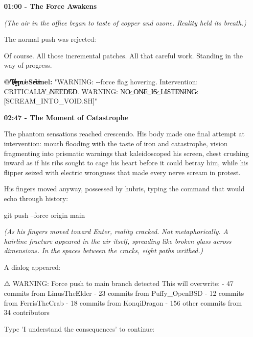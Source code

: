 \textbf{01:00 - The Force Awakens}

\emph{(The air in the office began to taste of copper and ozone. Reality held its breath.)}

The normal push was rejected:


Of course. All those incremental patches. All that careful work. Standing in the way of progress.

\textbf{@Ͳ̸̵̷e̶̷͍p̵ʟ̸eSe̶᷅t̷i̶nel:} "WARNING: -\/-force flag hovering. Intervention: CRITICAL̶L̷Y̵\_̸N̷E̶E̵D̸E̷D̵. WARNING: N̶O̷\_̵O̸N̷E̶\_̵I̸S̷\_̵L̸I̷S̶T̵E̸N̷I̵N̸G̷. {[}SCREAM\_INTO\_VOID.SH{]}"

\textbf{02:47 - The Moment of Catastrophe}

The phantom sensations reached crescendo. His body made one final attempt at intervention: mouth flooding with the taste of iron and catastrophe, vision fragmenting into prismatic warnings that kaleidoscoped his screen, chest crushing inward as if his ribs sought to cage his heart before it could betray him, while his flipper seized with electric wrongness that made every nerve scream in protest.

His fingers moved anyway, possessed by hubris, typing the command that would echo through history:

\begin{codeblock}
git push --force origin main
\end{codeblock}

\emph{(As his fingers moved toward Enter, reality cracked. Not metaphorically. A hairline fracture appeared in the air itself, spreading like broken glass across dimensions. In the spaces between the cracks, eight paths writhed.)}

A dialog appeared:

\begin{codeblock}
⚠️  WARNING: Force push to main branch detected
This will overwrite:
- 47 commits from LinusTheElder
- 23 commits from Puffy_OpenBSD  
- 12 commits from FerrisTheCrab
- 18 commits from KonqiDragon
- 156 other commits from 34 contributors

Type 'I understand the consequences' to continue:
\end{codeblock}

